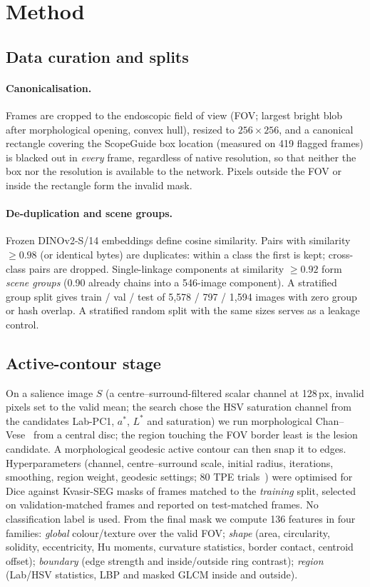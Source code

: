 \section{Method}
\subsection{Data curation and splits}\label{sec:data}
\paragraph{Canonicalisation.}
Frames are cropped to the endoscopic field of view (FOV; largest bright blob after morphological opening,
convex hull), resized to $256{\times}256$, and a canonical rectangle covering the ScopeGuide box location
(measured on 419 flagged frames) is blacked out in \emph{every} frame, regardless of native resolution, so that neither
the box nor the resolution is available to the network. Pixels outside the FOV or inside the rectangle form the invalid mask.

\paragraph{De-duplication and scene groups.}
Frozen DINOv2-S/14 embeddings define cosine similarity. Pairs with similarity $\ge 0.98$ (or identical bytes) are duplicates:
within a class the first is kept; cross-class pairs are dropped. Single-linkage components at similarity $\ge 0.92$ form
\emph{scene groups} (0.90 already chains into a 546-image component). A stratified group split gives train / val / test of
5{,}578 / 797 / 1{,}594 images with zero group or hash overlap. A stratified random split with the same sizes serves as a leakage control.

\subsection{Active-contour stage}\label{sec:ac}
On a salience image $S$ (a centre--surround-filtered scalar channel at 128\,px, invalid pixels set to the valid mean;
the search chose the HSV saturation channel from the candidates Lab-PC1, $a^*$, $L^*$ and saturation) we run morphological Chan--Vese~\cite{chan2001active,marquezneila2014morphological} from a central disc;
the region touching the FOV border least is the lesion candidate. A morphological geodesic active contour can then
snap it to edges. Hyperparameters (channel, centre--surround scale, initial radius, iterations, smoothing, region
weight, geodesic settings; 80 TPE trials~\cite{akiba2019optuna}) were optimised for Dice against Kvasir-SEG masks of
frames matched to the \emph{training} split, selected on validation-matched frames and reported on test-matched frames.
No classification label is used. From the final mask we compute 136 features in four families: \emph{global} colour/texture
over the valid FOV; \emph{shape} (area, circularity, solidity, eccentricity, Hu moments, curvature statistics, border contact, centroid offset);
\emph{boundary} (edge strength and inside/outside ring contrast); \emph{region} (Lab/HSV statistics, LBP and masked GLCM inside and outside).

